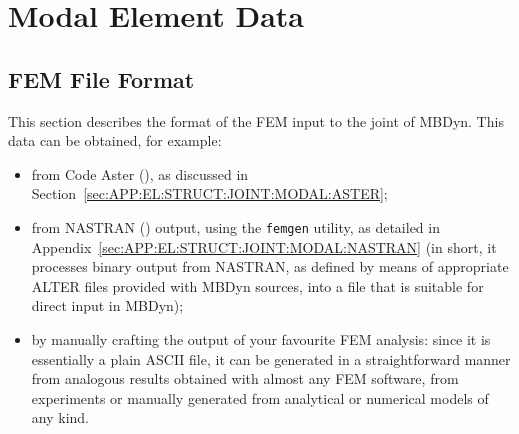 %
%
%
%
%
% 
%
%

\chapter{Modal Element Data}

\section{FEM File Format}
\label{sec:APP:EL:STRUCT:JOINT:MODAL:FORMAT}

This section describes the format of the FEM input to the 
joint of MBDyn.
This data can be obtained, for example:
\begin{itemize}
\item from Code Aster
(),
as discussed in Section~\ref{sec:APP:EL:STRUCT:JOINT:MODAL:ASTER};
\item from NASTRAN
()
output, using the \texttt{femgen} utility,
as detailed in Appendix~\ref{sec:APP:EL:STRUCT:JOINT:MODAL:NASTRAN}
(in short, it processes binary output from NASTRAN, as defined by means
of appropriate ALTER files provided with MBDyn sources, into a file
that is suitable for direct input in MBDyn);
\item by manually crafting the output of your favourite FEM analysis:
since it is essentially a plain ASCII file, it can be generated
in a straightforward manner from analogous results obtained with
almost any FEM software, from experiments or manually generated
from analytical or numerical models of any kind.
\end{itemize}


